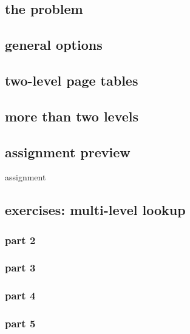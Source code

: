 \subsection{the problem}


\subsection{general options}


\subsection{two-level page tables}




\subsection{more than two levels}


\subsection{assignment preview}
\begin{frame}{assignment}
\end{frame}

\subsection{exercises: multi-level lookup}
\subsubsection{part 2}

\subsubsection{part 3}


\subsubsection{part 4}

\subsubsection{part 5}


